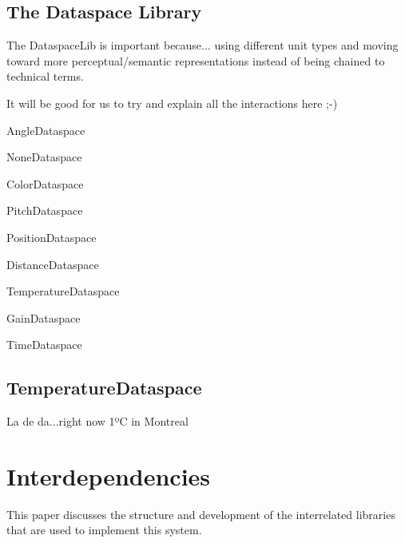 \documentclass{article}
\newenvironment{packed_item}{
\begin{itemize}
  \setlength{\itemsep}{1pt}
  \setlength{\parskip}{0pt}
  \setlength{\parsep}{0pt}
}{\end{itemize}}
\begin{document}


\subsection{The Dataspace Library} %
\label{sec:dataspacelib}
The DataspaceLib is important because...
using different unit types and moving toward more perceptual/semantic representations instead of being chained to technical terms.



It will be good for us to try and explain all the interactions here ;-) 
\begin{packed_item}
	\item AngleDataspace
	\item NoneDataspace
	\item ColorDataspace
	\item PitchDataspace
	\item PositionDataspace
	\item DistanceDataspace
    \item TemperatureDataspace
    \item GainDataspace
	\item TimeDataspace
\end{packed_item}
	


\subsection{TemperatureDataspace}\label{subsec:temperature_dataspace}

La de da...right now 1ºC in Montreal %



\section{Interdependencies}\label{sec:interdependencies}

This paper discusses the structure and development of the interrelated libraries that are used to implement this system.



\end{document}

